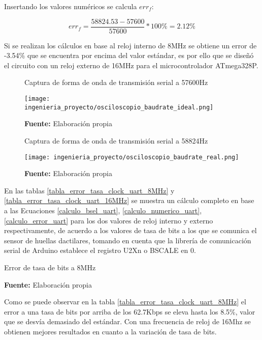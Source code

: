 \documentclass[../principal]{subfiles}
\begin{document}
  Insertando los valores numéricos se calcula $ err_{f} $:

  \vspace{-1.5em}
  \begin{equation}
    \label{calculo_numerico_error_uart}
    err_{f} = \frac{58824.53 - 57600}{57600} * 100\% = 2.12\%
  \end{equation}
  \vspace{-2em}

  Si se realizan los cálculos en base al reloj interno de 8MHz se obtiene un error de -3.54\% que se encuentra por encima del valor estándar, es por ello que se diseñó el circuito con un reloj externo de 16MHz para el microcontrolador ATmega328P.

  \begin{figure}[h]
    \centering
    \caption{Captura de forma de onda de transmisión serial a 57600Hz}
    \texttt{[image: ingenieria\_proyecto/osciloscopio\_baudrate\_ideal.png]}
    \caption*{\textbf{Fuente:} Elaboración propia}
    \label{fig:osciloscopio_baudrate_ideal}
  \end{figure}

  \begin{figure}[h]
    \centering
    \caption{Captura de forma de onda de transmisión serial a 58824Hz}
    \texttt{[image: ingenieria\_proyecto/osciloscopio\_baudrate\_real.png]}
    \caption*{\textbf{Fuente:} Elaboración propia}
    \label{fig:osciloscopio_baudrate_real}
  \end{figure}

  En las tablas \ref{tabla_error_tasa_clock_uart_8MHz} y \ref{tabla_error_tasa_clock_uart_16MHz} se muestra un cálculo completo en base a las Ecuaciones \ref{calculo_bsel_uart}, \ref{calculo_numerico_uart}, \ref{calculo_error_uart} para los dos valores de reloj interno y externo respectivamente, de acuerdo a los valores de tasa de bits a los que se comunica el sensor de huellas dactilares, tomando en cuenta que la librería de comunicación serial de Arduino establece el registro U2Xn o BSCALE en 0.

  \begin{table}[H]
    \caption{Error de tasa de bits a 8MHz}
    \label{tabla_error_tasa_clock_uart_8MHz}
    \centering
    
    \caption*{\textbf{Fuente:} Elaboración propia}
  \end{table}

  Como se puede observar en la tabla \ref{tabla_error_tasa_clock_uart_8MHz} el error a una tasa de bits por arriba de los 62.7Kbps se eleva hasta los 8.5\%, valor que se desvía demasiado del estándar. Con una frecuencia de reloj de 16Mhz se obtienen mejores resultados en cuanto a la variación de tasa de bits.
\end{document}
